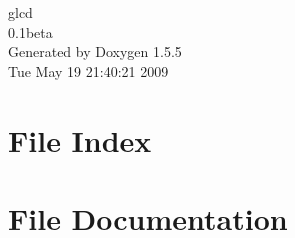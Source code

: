 \documentclass[a4paper]{book}
\begin{document}
\begin{titlepage}
\vspace*{7cm}
\begin{center}
{\Large glcd \\[1ex]\large 0.1beta }\\
\vspace*{1cm}
{\large Generated by Doxygen 1.5.5}\\
\vspace*{0.5cm}
{\small Tue May 19 21:40:21 2009}\\
\end{center}
\end{titlepage}
\clearemptydoublepage
{}
\tableofcontents
\clearemptydoublepage
{}
\chapter{File Index}

\chapter{File Documentation}






\printindex
\end{document}
